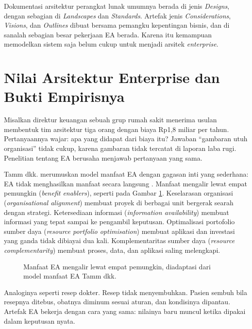 \begin{pendalaman}[title={Pendalaman Teknis (opsional): Dokumentasi Arsitektur Perangkat Lunak dan Artefak EA}]
  Dokumentasi arsitektur perangkat lunak umumnya berada di jenis
  \textit{Designs}, dengan sebagian di \textit{Landscapes} dan
  \textit{Standards}. Artefak jenis \textit{Considerations}, \textit{Visions},
  dan \textit{Outlines} dibuat bersama pemangku kepentingan bisnis, dan di
  sanalah sebagian besar pekerjaan EA berada. Karena itu kemampuan memodelkan
  sistem saja belum cukup untuk menjadi arsitek \textit{enterprise}.
\end{pendalaman}

\section{Nilai Arsitektur Enterprise dan Bukti Empirisnya}

Misalkan direktur keuangan sebuah grup rumah sakit menerima usulan membentuk
tim arsitektur tiga orang dengan biaya Rp1,8 miliar per tahun. Pertanyaannya
wajar: apa yang didapat dari biaya itu? Jawaban ``gambaran utuh organisasi''
tidak cukup, karena gambaran tidak tercatat di laporan laba rugi. Penelitian
tentang EA berusaha menjawab pertanyaan yang sama.

Tamm dkk. merumuskan model manfaat EA dengan gagasan inti yang sederhana: EA
tidak menghasilkan manfaat secara langsung \cite{tamm2011}. Manfaat mengalir
lewat empat pemungkin (\textit{benefit enablers}), seperti pada Gambar
\ref{fig:ch01-nilai}. Keselarasan organisasi (\textit{organisational
alignment}) membuat proyek di berbagai unit bergerak searah dengan strategi.
Ketersediaan informasi (\textit{information availability}) membuat informasi
yang tepat sampai ke pengambil keputusan. Optimalisasi portofolio sumber daya
(\textit{resource portfolio optimisation}) membuat aplikasi dan investasi yang
ganda tidak dibiayai dua kali. Komplementaritas sumber daya (\textit{resource
complementarity}) membuat proses, data, dan aplikasi saling melengkapi.

\begin{figure}[!htb]
  \centering
  
  \caption{Manfaat EA mengalir lewat empat pemungkin, diadaptasi dari model
           manfaat EA Tamm dkk. \cite{tamm2011}}
  \label{fig:ch01-nilai}
\end{figure}

Analoginya seperti resep dokter. Resep tidak menyembuhkan. Pasien sembuh bila
resepnya ditebus, obatnya diminum sesuai aturan, dan kondisinya dipantau.
Artefak EA bekerja dengan cara yang sama: nilainya baru muncul ketika dipakai
dalam keputusan nyata.

